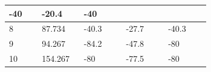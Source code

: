 \documentclass[UTF8,10pt,a4paper,fontset=fandol]{ctexart}
\newcommand{\fieldvalue}[1]{#1}
\begin{document}
\begin{center}
\begin{tabular}{|p{0.14\linewidth}|p{0.18\linewidth}|p{0.18\linewidth}|p{0.18\linewidth}|p{0.18\linewidth}|}
\fieldvalue{-40} &
\fieldvalue{-20.4} &
\fieldvalue{-40}\\
\hline
8 &
\fieldvalue{87.734} &
\fieldvalue{-40.3} &
\fieldvalue{-27.7} &
\fieldvalue{-40.3}\\
\hline
9 &
\fieldvalue{94.267} &
\fieldvalue{-84.2} &
\fieldvalue{-47.8} &
\fieldvalue{-80}\\
\hline
10 &
\fieldvalue{154.267} &
\fieldvalue{-80} &
\fieldvalue{-77.5} &
\fieldvalue{-80}\\
\hline
\end{tabular}
\end{center}
\end{document}
